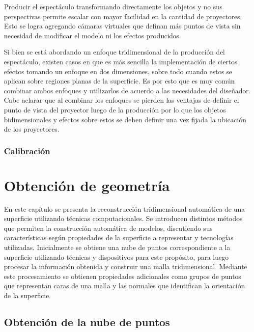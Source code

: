 Producir el espectáculo transformando directamente los objetos y no sus perspectivas permite escalar con mayor facilidad en la cantidad de proyectores. Esto se logra agregando cámaras virtuales que definan más puntos de vista sin necesidad de modificar el modelo ni los efectos producidos.

Si bien se está abordando un enfoque tridimensional de la producción del espectáculo, existen casos en que es más sencilla la implementación de ciertos efectos tomando un enfoque en dos dimensiones, sobre todo cuando estos se aplican sobre regiones planas de la superficie. Es por esto que es muy común combinar ambos enfoques y utilizarlos de acuerdo a las necesidades del diseñador. Cabe aclarar que al combinar los enfoques se pierden las ventajas de definir el punto de vista del proyector luego de la producción por lo que los objetos bidimensionales y efectos sobre estos se deben definir una vez fijada la ubicación de los proyectores.

\subsubsection{Calibración}


\section{Obtención de geometría}

En este capítulo se presenta la reconstrucción tridimensional automática de una superficie utilizando técnicas computacionales.
Se introducen distintos métodos que permiten la construcción automática de modelos, discutiendo sus características según propiedades de la superficie a representar y tecnologías utilizadas. Inicialmente se obtiene una nube de puntos correspondiente a la superficie utilizando técnicas y dispositivos para este propósito, para luego procesar la información obtenida y construir una malla tridimensional. Mediante este procesamiento se obtienen propiedades adicionales como grupos de puntos que representan caras de una malla y las normales que identifican la orientación de la superficie.

\subsection{Obtención de la nube de puntos}

